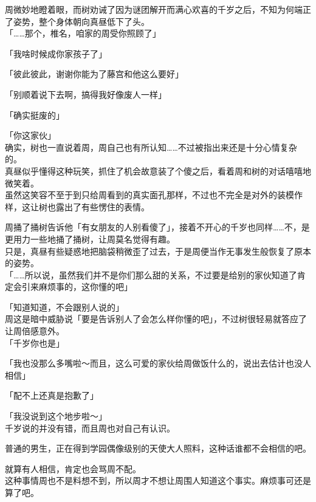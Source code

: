 周微妙地瞪着眼，而树劝诫了因为谜团解开而满心欢喜的千岁之后，不知为何端正了姿势，整个身体朝向真昼低下了头。\\

「……那个，椎名，咱家的周受你照顾了」

「我啥时候成你家孩子了」

「彼此彼此，谢谢你能为了藤宫和他这么要好」

「别顺着说下去啊，搞得我好像废人一样」

「确实挺废的」

「你这家伙」\\

确实，树也一直说着周，周自己也有所认知……不过被指出来还是十分心情复杂的。\\

真昼似乎懂得这种玩笑，抓住了机会故意装了个傻之后，看着周和树的对话嘻嘻地微笑着。\\

虽然这笑容不至于到只给周看到的真实面孔那样，不过也不完全是对外的装模作样，这让树也露出了有些愣住的表情。

周捅了捅树告诉他「有女朋友的人别看傻了」，接着不开心的千岁也同样……不，是更用力一些地捅了捅树，让周莫名觉得有趣。\\

只是，真昼有些疑惑地把脑袋稍微歪了过去，于是周便当作无事发生般恢复了原本的姿势。\\

「……所以说，虽然我们并不是你们那么甜的关系，不过要是给别的家伙知道了肯定会引来麻烦事的，这你懂的吧」

「知道知道，不会跟别人说的」\\

周这是暗中威胁说「要是告诉别人了会怎么样你懂的吧」，不过树很轻易就答应了让周倍感意外。\\

「千岁你也是」

「我也没那么多嘴啦～而且，这么可爱的家伙给周做饭什么的，说出去估计也没人相信」

「配不上还真是抱歉了」

「我没说到这个地步啦～」\\

千岁说的并没有错，而且周也对自己有认识。

普通的男生，正在得到学园偶像级别的天使大人照料，这种话谁都不会相信的吧。

就算有人相信，肯定也会骂周不配。\\

这种事情周也不是料想不到，所以周才不想让周围人知道这个事实。麻烦事可还是算了吧。\\

